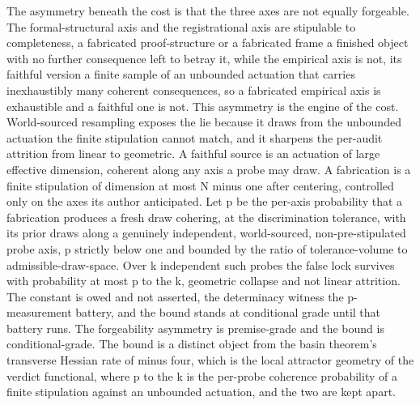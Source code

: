 \documentclass[10pt,twocolumn]{article}
\begin{document}
The asymmetry beneath the cost is that the three axes are not equally
forgeable. The formal-structural axis and the registrational axis are
stipulable to completeness, a fabricated proof-structure or a fabricated
frame a finished object with no further consequence left to betray it,
while the empirical axis is not, its faithful version a finite sample of
an unbounded actuation that carries inexhaustibly many coherent
consequences, so a fabricated empirical axis is exhaustible and a
faithful one is not. This asymmetry is the engine of the cost.
World-sourced resampling exposes the lie because it draws from the
unbounded actuation the finite stipulation cannot match, and it sharpens
the per-audit attrition from linear to geometric. A faithful source is
an actuation of large effective dimension, coherent along any axis a
probe may draw. A fabrication is a finite stipulation of dimension at
most N minus one after centering, controlled only on the axes its author
anticipated. Let p be the per-axis probability that a fabrication
produces a fresh draw cohering, at the discrimination tolerance, with
its prior draws along a genuinely independent, world-sourced,
non-pre-stipulated probe axis, p strictly below one and bounded by the
ratio of tolerance-volume to admissible-draw-space. Over k independent
such probes the false lock survives with probability at most p to the k,
geometric collapse and not linear attrition. The constant is owed and
not asserted, the determinacy witness the p-measurement battery, and the
bound stands at conditional grade until that battery runs. The
forgeability asymmetry is premise-grade and the bound is
conditional-grade. The bound is a distinct object from the basin
theorem's transverse Hessian rate of minus four, which is the local
attractor geometry of the verdict functional, where p to the k is the
per-probe coherence probability of a finite stipulation against an
unbounded actuation, and the two are kept apart.
\end{document}
